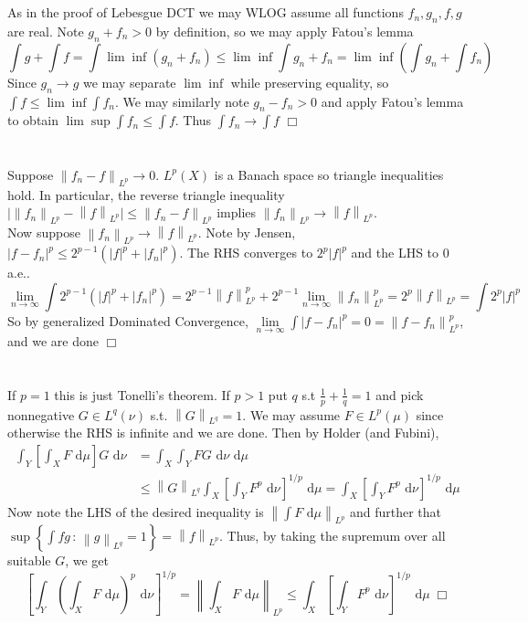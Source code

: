 \documentclass{article}
\newcommand{\norm}[1]{\left\lVert#1\right\rVert}
\begin{document}
\section{}
As in the proof of Lebesgue DCT we may WLOG assume all functions $f_n, g_n, f, g$ are real.
Note $g_n + f_n > 0$ by definition, so we may apply Fatou's lemma
$$\int g + \int f = \int \lim\inf (g_n + f_n) \leq \lim\inf \int g_n + f_n = \lim\inf \left(\int g_n + \int f_n\right)$$
Since $g_n \rightarrow g$ we may separate $\lim\inf$ while preserving equality, so $\int f \leq \lim\inf \int f_n$.
We may similarly note $g_n - f_n > 0$ and apply Fatou's lemma to obtain $\lim\sup \int f_n \leq \int f$. Thus $\int f_n \rightarrow \int f$ $\Box$

\section{}
Suppose $\norm{f_n - f}_{L^{p}} \to 0$. $L^p(X)$ is a Banach space so triangle inequalities hold. In particular, the reverse triangle inequality $\lvert \norm{f_n}_{L^{p}} - \norm{f}_{L^{p}} \rvert \leq \norm{f_n - f}_{L^{p}}$ implies $\norm{f_n}_{L^{p}} \to \norm{f}_{L^{p}}$.\\
Now suppose $\norm{f_n}_{L^{p}} \to \norm{f}_{L^{p}}$. Note by Jensen, $|f - f_n|^p \leq 2^{p-1} \left(|f|^p + |f_n|^p\right)$. The RHS converges to $2^p|f|^p$ and the LHS to 0 a.e..
$$\lim\limits_{n\to\infty} \int 2^{p-1}\left(|f|^p + |f_n|^p\right) = 2^{p-1}\norm{f}_{L^{p}}^p + 2^{p-1}\lim\limits_{n\to\infty} \norm{f_n}_{L^{p}}^p = 2^p \norm{f}_{L^{p}} = \int 2^p|f|^p$$
So by generalized Dominated Convergence, $\lim\limits_{n\to\infty} \int |f-f_n|^p = 0 = \norm{f-f_n}_{L^{p}}^p$, and we are done $\Box$

\section{}
If $p = 1$ this is just Tonelli's theorem. If $p > 1$ put $q$ s.t $\frac{1}{p} + \frac{1}{q} = 1$ and pick nonnegative $G \in L^q(\nu)$ s.t. $\norm{G}_{L^{q}} = 1$. We may assume $F \in L^p(\mu)$ since otherwise the RHS is infinite and we are done. Then by Holder (and Fubini),
\begin{equation*}
\begin{split}
  \int_Y \left[ \int_X F \textrm{ d}\mu \right] G \textrm{ d}\nu &= \int_X \int_Y FG \textrm{ d}\nu \textrm{ d}\mu\\
  &\leq \norm{G}_{L^{q}}\int_X \left[ \int_Y F^p \textrm{ d}\nu \right]^{1/p} \textrm{ d}\mu = \int_X \left[ \int_Y F^p \textrm{ d}\nu \right]^{1/p} \textrm{ d}\mu
\end{split}
\end{equation*}
Now note the LHS of the desired inequality is $\norm{\int F \textrm{ d}\mu}_{L^{p}}$ and further that $\sup \left\{ \int fg \,:\, \norm{g}_{L^{q}} = 1 \right\} = \norm{f}_{L^{p}}$. Thus, by taking the supremum over all suitable $G$, we get
$$\left[\int_Y \left(\int_X F \textrm{ d}\mu\right)^p \textrm{ d}\nu\right]^{1/p} = \norm{\int_X F \textrm{ d}\mu}_{L^{p}} \leq \int_X \left[ \int_Y F^p \textrm{ d}\nu \right]^{1/p} \textrm{ d}\mu \; \Box$$
\end{document}
